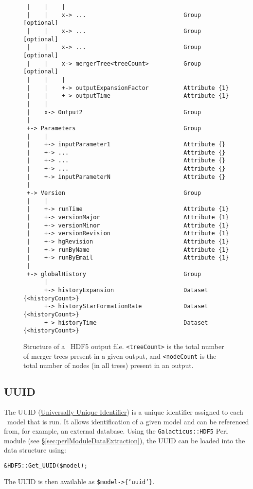 \begin{figure}
\begin{center}
\begin{verbatim}
 |    |    |
 |    |    x-> ...                            Group              [optional]
 |    |    x-> ...                            Group              [optional]
 |    |    x-> ...                            Group              [optional]
 |    |    x-> mergerTree<treeCount>          Group              [optional]
 |    |    |
 |    |    +-> outputExpansionFactor          Attribute {1}
 |    |    +-> outputTime                     Attribute {1}
 |    |
 |    x-> Output2                             Group
 |
 +-> Parameters                               Group
 |    |
 |    +-> inputParameter1                     Attribute {}
 |    +-> ...                                 Attribute {}
 |    +-> ...                                 Attribute {}
 |    +-> ...                                 Attribute {}
 |    +-> inputParameterN                     Attribute {}
 |
 +-> Version                                  Group
 |    |
 |    +-> runTime                             Attribute {1}
 |    +-> versionMajor                        Attribute {1}
 |    +-> versionMinor                        Attribute {1}
 |    +-> versionRevision                     Attribute {1}
 |    +-> hgRevision                          Attribute {1}
 |    +-> runByName                           Attribute {1}
 |    +-> runByEmail                          Attribute {1}
 |
 +-> globalHistory                            Group
      |
      +-> historyExpansion                    Dataset {<historyCount>}
      +-> historyStarFormationRate            Dataset {<historyCount>}
      +-> historyTime                         Dataset {<historyCount>}
\end{verbatim}
\end{center}
\caption{Structure of a \glc\ HDF5 output file. {\tt <treeCount>} is the total number of merger trees present in a given output, and {\tt <nodeCount} is the total number of nodes (in all trees) present in an output.}
\label{fig:glcOutputFileStructure}
\end{figure}

\subsection{UUID}\label{sec:UUID}

The UUID (\href{https://secure.wikimedia.org/wikipedia/en/wiki/Universally_unique_identifier}{Universally Unique Identifier}) is a unique identifier assigned to each \glc\ model that is run. It allows identification of a given model and can be referenced from, for example, an external database. Using the {\tt Galacticus::HDF5} Perl module (see \S\ref{sec:perlModuleDataExtraction}), the UUID can be loaded into the data structure using:
\begin{verbatim}
&HDF5::Get_UUID($model);
\end{verbatim}
The UUID is then available as {\tt \$model-\textgreater\{'uuid'\}}.

